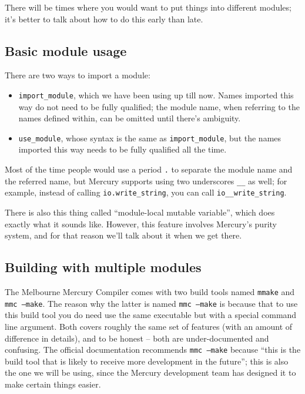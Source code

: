 There will be times where you would want to put things into different modules; it's better to talk about how to do this early than late.

\subsection{Basic module usage}

There are two ways to import a module:

\begin{itemize}
\item \texttt{import\_module}, which we have been using up till now. Names imported this way do not need to be fully qualified; the module name, when referring to the names defined within, can be omitted until there's ambiguity.
\item \texttt{use\_module}, whose syntax is the same as \texttt{import\_module}, but the names imported this way needs to be fully qualified all the time.
\end{itemize}

Most of the time people would use a period \texttt{.} to separate the module name and the referred name, but Mercury supports using two underscores \texttt{\_\_} as well; for example, instead of calling \texttt{io.write\_string}, you can call \texttt{io\_\_write\_string}.

There is also this thing called ``module-local mutable variable'', which does exactly what it sounds like. However, this feature involves Mercury's purity system, and for that reason we'll talk about it when we get there.


\subsection{Building with multiple modules}

The Melbourne Mercury Compiler comes with two build tools named \texttt{mmake} and \texttt{mmc --make}. The reason why the latter is named \texttt{mmc --make} is because that to use this build tool you do need use the same executable but with a special command line argument. Both covers roughly the same set of features (with an amount of difference in details), and to be honest -- both are under-documented and confusing. The official documentation recommends \texttt{mmc --make} because ``this is the build tool that is likely to receive more development in the future''; this is also the one we will be using, since the Mercury development team has designed it to make certain things easier.

